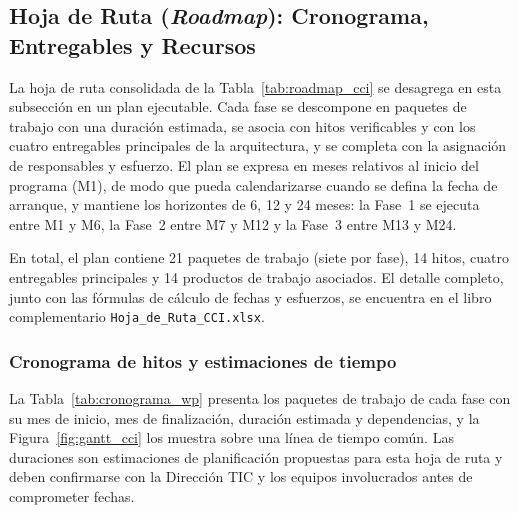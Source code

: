 \subsection{Hoja de Ruta (\textit{Roadmap}): Cronograma, Entregables y Recursos}
\label{subsec:roadmap_detallada}

La hoja de ruta consolidada de la Tabla~\ref{tab:roadmap_cci} se desagrega en esta subsección en un plan ejecutable.
Cada fase se descompone en paquetes de trabajo con una duración estimada, se asocia con hitos verificables y con los cuatro
entregables principales de la arquitectura, y se completa con la asignación de responsables y esfuerzo. El plan se expresa en
meses relativos al inicio del programa (M1), de modo que pueda calendarizarse cuando se defina la fecha de arranque, y mantiene
los horizontes de 6, 12 y 24 meses: la Fase~1 se ejecuta entre M1 y M6, la Fase~2 entre M7 y M12 y la Fase~3 entre M13 y M24.

En total, el plan contiene 21 paquetes de trabajo (siete por fase), 14 hitos, cuatro entregables principales y 14 productos de
trabajo asociados. El detalle completo, junto con las fórmulas de cálculo de fechas y esfuerzos, se encuentra en el libro
complementario \texttt{Hoja\_de\_Ruta\_CCI.xlsx}.


\subsubsection{Cronograma de hitos y estimaciones de tiempo}

La Tabla~\ref{tab:cronograma_wp} presenta los paquetes de trabajo de cada fase con su mes de inicio, mes de finalización,
duración estimada y dependencias, y la Figura~\ref{fig:gantt_cci} los muestra sobre una línea de tiempo común. Las duraciones
son estimaciones de planificación propuestas para esta hoja de ruta y deben confirmarse con la Dirección TIC y los equipos
involucrados antes de comprometer fechas.

